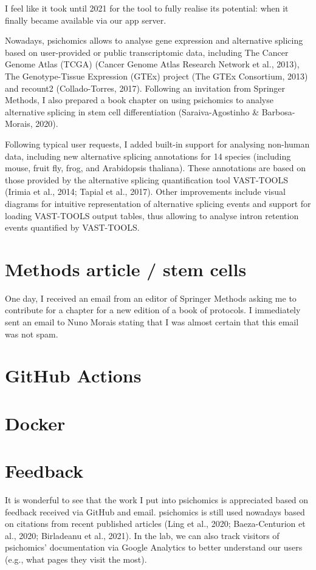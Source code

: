 I feel like it took until 2021 for the tool to fully realise its potential: when it finally became available via our app server.

Nowadays, psichomics allows to analyse gene expression and alternative splicing based on user-provided or public transcriptomic data, including The Cancer Genome Atlas (TCGA) (Cancer Genome Atlas Research Network et al., 2013), The Genotype-Tissue Expression (GTEx) project (The GTEx Consortium, 2013) and recount2 (Collado-Torres, 2017). Following an invitation from Springer Methods, I also prepared a book chapter on using psichomics to analyse alternative splicing in stem cell differentiation (Saraiva-Agostinho \& Barbosa-Morais, 2020).

Following typical user requests, I added built-in support for analysing non-human data, including new alternative splicing annotations for 14 species (including mouse, fruit fly, frog, and Arabidopsis thaliana). These annotations are based on those provided by the alternative splicing quantification tool VAST-TOOLS (Irimia et al., 2014; Tapial et al., 2017). Other improvements include visual diagrams for intuitive representation of alternative splicing events and support for loading VAST-TOOLS output tables, thus allowing to analyse intron retention events quantified by VAST-TOOLS.

\section{Methods article / stem cells}

One day, I received an email from an editor of Springer Methods asking me to contribute for a chapter for a new edition of a book of protocols. I immediately sent an email to Nuno Morais stating that I was almost certain that this email was not spam.

\section{GitHub Actions}

\section{Docker}

\section{Feedback}

It is wonderful to see that the work I put into psichomics is appreciated based on feedback received via GitHub and email. psichomics is still used nowadays based on citations from recent published articles (Ling et al., 2020; Baeza-Centurion et al., 2020; Birladeanu et al., 2021). In the lab, we can also track visitors of psichomics’ documentation via Google Analytics to better understand our users (e.g., what pages they visit the most).
